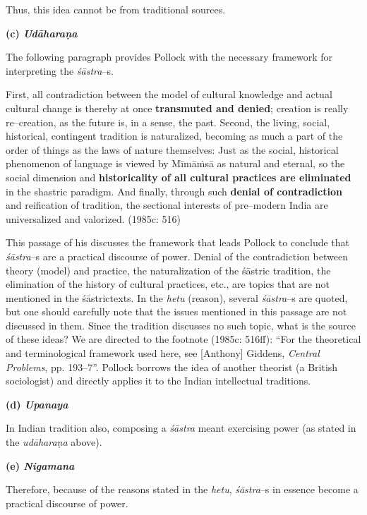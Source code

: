 Thus, this idea cannot be from traditional sources.

\textbf{(c) \textit{Udāharaṇa}}

The following paragraph provides Pollock with the necessary framework for interpreting the \textit{śāstra}–s.

\begin{myquote}
First, all contradiction between the model of cultural knowledge and actual cultural change is thereby at once \textbf{transmuted and denied}; creation is really re–creation, as the future is, in a sense, the past. Second, the living, social, historical, contingent tradition is naturalized, becoming as much a part of the order of things as the laws of nature themselves: Just as the social, historical phenomenon of language is viewed by Mīmāṁsā as natural and eternal, so the social dimension and \textbf{historicality of all cultural practices are eliminated} in the shastric paradigm. And finally, through such \textbf{denial of contradiction} and reification of tradition, the sectional interests of pre–modern India are universalized and valorized. (1985c: 516)
\end{myquote}

This passage of his discusses the framework that leads Pollock to conclude that\textit{ śāstra}–s are a practical discourse of power. Denial of the contradiction between theory (model) and practice, the naturalization of the śāstric tradition, the elimination of the history of cultural practices, etc., are topics that are not mentioned in the śāstrictexts. In the \textit{hetu} (reason), several \textit{śāstra}–s are quoted, but one should carefully note that the issues mentioned in this passage are not discussed in them. Since the tradition discusses no such topic, what is the source of these ideas? We are directed to the footnote (1985c: 516ff): “For the theoretical and terminological framework used here, see [Anthony] Giddens, \textit{Central Problems}, pp. 193–7”. Pollock borrows the idea of another theorist (a British sociologist) and directly applies it to the Indian intellectual traditions.

\textbf{(d) \textit{Upanaya}}

In Indian tradition also, composing a \textit{śāstra }meant exercising power (as stated in the \textit{udāharaṇa} above).

\textbf{(e) \textit{Nigamana}}

Therefore, because of the reasons stated in the \textit{hetu}, \textit{śāstra}–s in essence become a practical discourse of power.

